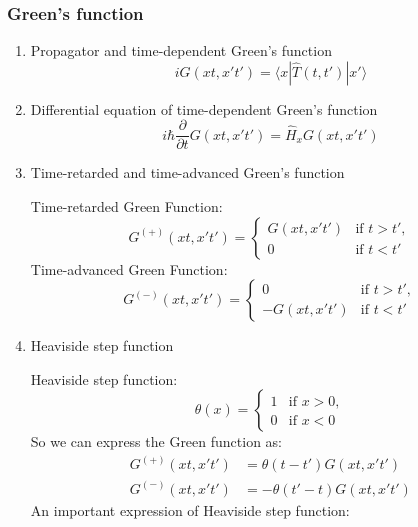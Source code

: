 \documentclass[12pt]{article}
\numberwithin{equation}{section}
\begin{document}
\subsubsection{Green's function}
\begin{enumerate}
\item Propagator and time-dependent Green's function
	\begin{equation}
		iG(xt,x't')=\langle x|\hat{T}(t,t')|x' \rangle
	\end{equation}
\item Differential equation of time-dependent Green's function
	\begin{equation}
		i\hbar \frac{\partial}{\partial t}G(xt,x't')=\hat{H}_x G(xt,x't')
	\end{equation}
\item Time-retarded and time-advanced Green's function \par
	Time-retarded Green Function:
	\begin{equation}
		G^{(+)}(xt,x't')=
		\begin{cases}
		G(xt,x't') & \text{if } t > t', \\
        		0 & \text{if } t < t'
    		\end{cases}
	\end{equation}
	Time-advanced Green Function:
	\begin{equation}
		G^{(-)}(xt,x't')=
		\begin{cases}
		0 & \text{if } t > t', \\
        		-G(xt,x't') & \text{if } t < t'
    		\end{cases}
	\end{equation}	
\item Heaviside step function\par
	Heaviside step function:
	\begin{equation}
		\theta (x)=
		\begin{cases}
		1 & \text{if } x > 0, \\
        		0 & \text{if } x < 0
    		\end{cases}
	\end{equation}	
	So we can express the Green function as:
	\begin{equation}\begin{split}
		G^{(+)}(xt,x't')&=\theta (t-t')G(xt,x't') \\
		G^{(-)}(xt,x't')&=-\theta (t'-t)G(xt,x't')
	\end{split}\end{equation}	
	An important expression of Heaviside step function:

\end{enumerate}
\end{document}
